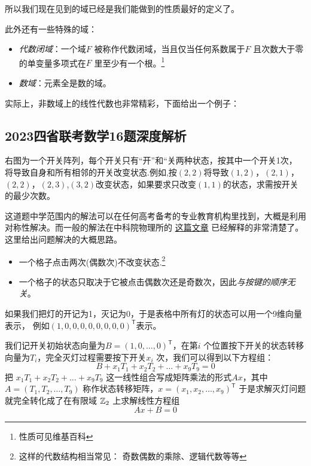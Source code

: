 所以我们现在见到的域已经是我们能做到的性质最好的定义了。

此外还有一些特殊的域：
\begin{itemize}
    \item \emph{代数闭域}：一个域\(F\) 被称作代数闭域，当且仅当任何系数属于\(F\)
        且次数大于零的单变量多项式在\(F\) 里至少有一个根。\footnote{性质可见维基百科}
    \item \emph{数域}：元素全是数的域。
\end{itemize}
实际上，非数域上的线性代数也非常精彩，下面给出一个例子：

\subsection{2023四省联考数学16题深度解析}

\begin{problem}[2023四省联考]
    右图为一个开关阵列，每个开关只有“开”和“关两种状态，按其中一个开关1次，
    将导致自身和所有相邻的开关改变状态.例如,按\((2,2)\)将导致\((1,2)\)，\((2,1)\)，
    \((2,2)\)，\((2,3)\),\((3,2)\)改变状态，如果要求只改变\((1,1)\)的状态，求需按开关的最少次数。
\end{problem}

这道题中学范围内的解法可以在任何高考备考的专业教育机构里找到，大概是利用对称性解决。而一般的解法在中科院物理所的
\href{https://mp.weixin.qq.com/s/k15Xlib2k9JOVrvBifQoiQ}{这篇文章}
已经解释的非常清楚了。这里给出问题解决的大概思路。

\begin{itemize}
    \item 一个格子点击两次(偶数次)不改变状态.\footnote{这样的代数结构相当常见： 奇数偶数的乘除、逻辑代数等等}
    \item 一个格子的状态只取决于它被点击偶数次还是奇数次，因此\emph{与按键的顺序无关}。
\end{itemize}

如果我们把灯的开记为1，灭记为0，于是表格中所有灯的状态可以用一个9维向量表示，
例如\((1,0,0,0,0,0,0,0,0)^{\mathsf{T}}\)表示。

我们记开关初始状态向量为\(B=(1,0,\dots,0)^{\mathsf{T}}\)，在第\(i\)
个位置按下开关的状态转移向量为\(T_{i}\)，完全灭灯过程需要按下开关\(x_{i}\) 次，我们可以得到以下方程组：
\[
    B+ x_{1}T_{1}+x_{2}T_{2}+\dots+x_{9}T_{9}=0
\]
把 \(x_{1}T_{1}+x_{2}T_{2}+\dots+x_{9}T_{9}\)
这一线性组合写成矩阵乘法的形式\(Ax\)，其中\(A=(T_{1}, T_{2}, \dots,
T_{9})\) 称作状态转移矩阵，\(x=(x_{1}, x_{2}, \dots, x_{9})^{\mathsf{T}}\)
于是求解灭灯问题就完全转化成了在有限域
\(\mathbb{Z}_{2}\) 上求解线性方程组\[
    Ax+B=0
\]

